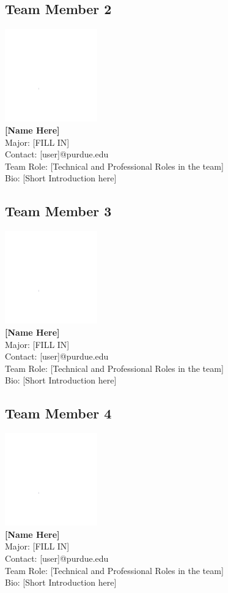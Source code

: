 \documentclass[letterpaper, 11pt]{article}
\begin{document}
\subsection{Team Member 2}
\includegraphics[height=4cm]{white.png} \\
\textbf{[Name Here]}\\
Major: [FILL IN]\\
Contact: [user]@purdue.edu\\
Team Role: [Technical and Professional Roles in the team] \\
Bio: [Short Introduction here]

\subsection{Team Member 3}
\includegraphics[height=4cm]{white.png} \\
\textbf{[Name Here]}\\
Major: [FILL IN]\\
Contact: [user]@purdue.edu\\
Team Role: [Technical and Professional Roles in the team] \\
Bio: [Short Introduction here]

\subsection{Team Member 4}
\includegraphics[height=4cm]{white.png} \\
\textbf{[Name Here]}\\
Major: [FILL IN]\\
Contact: [user]@purdue.edu\\
Team Role: [Technical and Professional Roles in the team] \\
Bio: [Short Introduction here]
\end{document}
